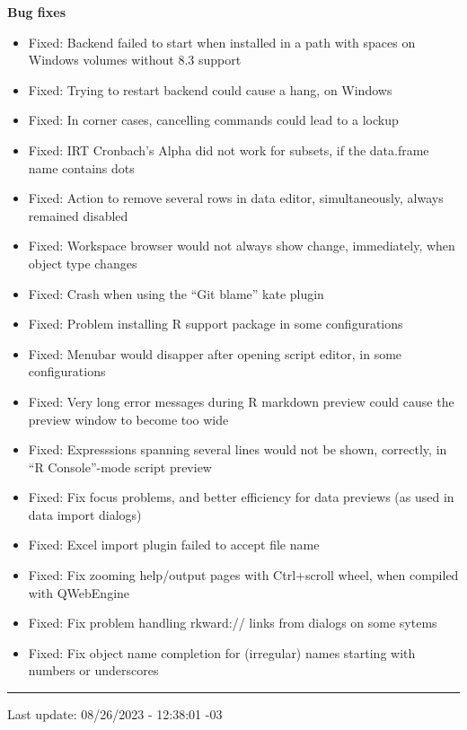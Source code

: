 \documentclass[
  letterpaper,
  DIV=11,
  numbers=noendperiod]{scrreprt}
\providecommand{\tightlist}{%
  \setlength{\itemsep}{0pt}\setlength{\parskip}{0pt}}\usepackage{longtable,booktabs,array}
\begin{document}
\textbf{Bug fixes}

\begin{itemize}
\tightlist
\item
  Fixed: Backend failed to start when installed in a path with spaces on
  Windows volumes without 8.3 support
\item
  Fixed: Trying to restart backend could cause a hang, on Windows
\item
  Fixed: In corner cases, cancelling commands could lead to a lockup
\item
  Fixed: IRT Cronbach's Alpha did not work for subsets, if the
  data.frame name contains dots
\item
  Fixed: Action to remove several rows in data editor, simultaneously,
  always remained disabled
\item
  Fixed: Workspace browser would not always show change, immediately,
  when object type changes
\item
  Fixed: Crash when using the ``Git blame'' kate plugin
\item
  Fixed: Problem installing R support package in some configurations
\item
  Fixed: Menubar would disapper after opening script editor, in some
  configurations
\item
  Fixed: Very long error messages during R markdown preview could cause
  the preview window to become too wide
\item
  Fixed: Expresssions spanning several lines would not be shown,
  correctly, in ``R Console''-mode script preview
\item
  Fixed: Fix focus problems, and better efficiency for data previews (as
  used in data import dialogs)
\item
  Fixed: Excel import plugin failed to accept file name
\item
  Fixed: Fix zooming help/output pages with Ctrl+scroll wheel, when
  compiled with QWebEngine
\item
  Fixed: Fix problem handling rkward:// links from dialogs on some
  sytems
\item
  Fixed: Fix object name completion for (irregular) names starting with
  numbers or underscores
\end{itemize}

\begin{center}\rule{0.5\linewidth}{0.5pt}\end{center}

Last update: 08/26/2023 - 12:38:01 -03
\end{document}
